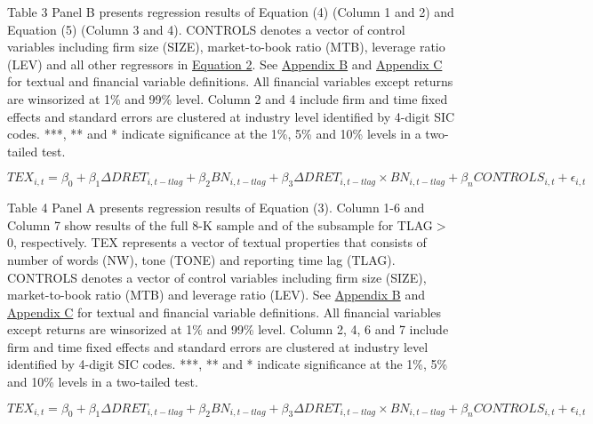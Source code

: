 Table 3 Panel B presents regression results of Equation (4) (Column 1 and 2) and Equation (5) (Column 3 and 4). CONTROLS denotes a vector of control variables including firm size (SIZE), market-to-book ratio (MTB), leverage ratio (LEV) and all other regressors in \hyperref[eq2]{Equation 2}. See \hyperref[appb]{Appendix B} and \hyperref[appc]{Appendix C} for textual and financial variable definitions. All financial variables except returns are winsorized at 1\% and 99\% level. Column 2 and 4 include firm and time fixed effects and standard errors are clustered at industry level identified by 4-digit SIC codes. ***, ** and * indicate significance at the 1\%, 5\% and 10\% levels in a two-tailed test.

\newpage

\setcounter{equation}{2}
\begin{equation}
TEX_{i,t}=\beta_0+\beta_1\Delta DRET_{i,t-tlag}+\beta_2BN_{i,t-tlag}+\beta_3\Delta DRET_{i,t-tlag}\times BN_{i,t-tlag}+\beta_nCONTROLS_{i,t}+\epsilon_{i,t}
\end{equation}

Table 4 Panel A presents regression results of Equation (3). Column 1-6 and Column 7 show results of the full 8-K sample and of the subsample for TLAG$>$0, respectively. TEX represents a vector of textual properties that consists of number of words (NW), tone (TONE) and reporting time lag (TLAG). CONTROLS denotes a vector of control variables including firm size (SIZE), market-to-book ratio (MTB) and leverage ratio (LEV). See \hyperref[appb]{Appendix B} and \hyperref[appc]{Appendix C} for textual and financial variable definitions. All financial variables except returns are winsorized at 1\% and 99\% level. Column 2, 4, 6 and 7 include firm and time fixed effects and standard errors are clustered at industry level identified by 4-digit SIC codes. ***, ** and * indicate significance at the 1\%, 5\% and 10\% levels in a two-tailed test.

\newpage

\setcounter{equation}{2}
\begin{equation}
TEX_{i,t}=\beta_0+\beta_1\Delta DRET_{i,t-tlag}+\beta_2BN_{i,t-tlag}+\beta_3\Delta DRET_{i,t-tlag}\times BN_{i,t-tlag}+\beta_nCONTROLS_{i,t}+\epsilon_{i,t}
\end{equation}


